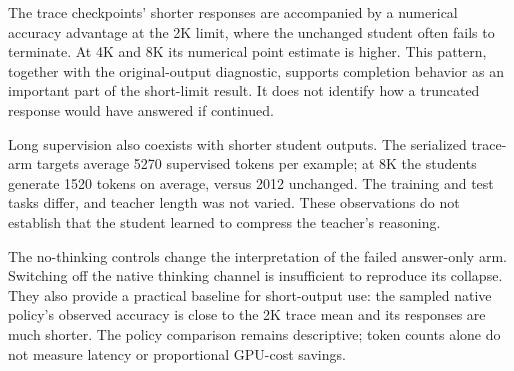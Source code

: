 The trace checkpoints' shorter responses are accompanied by a numerical accuracy advantage at the 2K limit, where the unchanged student often fails to terminate. At 4K and 8K its numerical point estimate is higher. This pattern, together with the original-output diagnostic, supports completion behavior as an important part of the short-limit result. It does not identify how a truncated response would have answered if continued.

Long supervision also coexists with shorter student outputs. The serialized trace-arm targets average 5270 supervised tokens per example; at 8K the students generate 1520 tokens on average, versus 2012 unchanged. The training and test tasks differ, and teacher length was not varied. These observations do not establish that the student learned to compress the teacher's reasoning.

The no-thinking controls change the interpretation of the failed answer-only arm. Switching off the native thinking channel is insufficient to reproduce its collapse. They also provide a practical baseline for short-output use: the sampled native policy's observed accuracy is close to the 2K trace mean and its responses are much shorter. The policy comparison remains descriptive; token counts alone do not measure latency or proportional GPU-cost savings.

